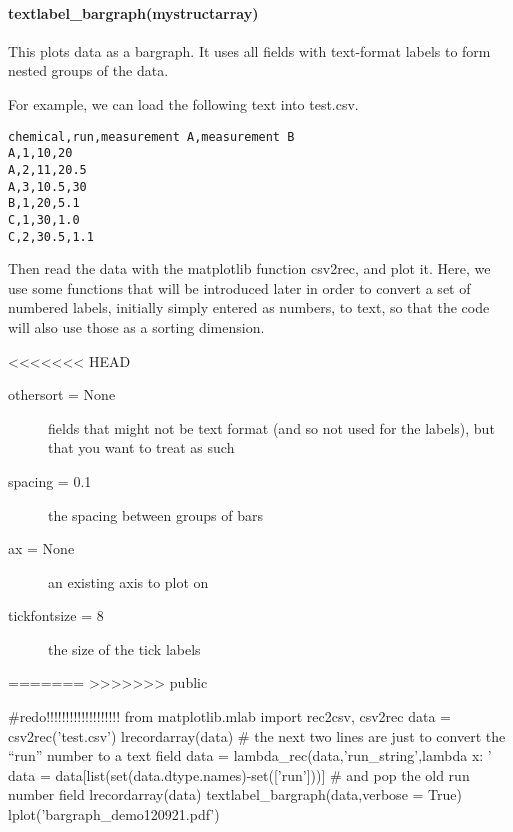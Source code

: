 \paragraph{textlabel\_bargraph(mystructarray)}
This plots data as a bargraph.
It uses all fields with text-format labels to form nested groups of the data.

For example, we can load the following text into test.csv.

\begin{verbatim}
chemical,run,measurement A,measurement B
A,1,10,20
A,2,11,20.5
A,3,10.5,30
B,1,20,5.1
C,1,30,1.0
C,2,30.5,1.1
\end{verbatim}

Then read the data with the matplotlib function csv2rec,
    and plot it.
Here, we use some functions that will be introduced later in order
    to convert a set of numbered labels, initially simply entered as numbers,
    to text, so that the code will also use those as a sorting dimension.

<<<<<<< HEAD
\begin{mykwargs}
    \begin{description}
        \item[othersort = None] fields that might not be text format (and so not used for the labels), but that you want to treat as such
        \item[spacing = 0.1]  the spacing between groups of bars
        \item[ax = None] an existing axis to plot on
        \item[tickfontsize = 8] the size of the tick labels
    \end{description}
\end{mykwargs}

=======
>>>>>>> public
\begin{python}
#redo!!!!!!!!!!!!!!!!!!!
from matplotlib.mlab import rec2csv, csv2rec
data = csv2rec('test.csv')
lrecordarray(data)
# the next two lines are just to convert the ``run'' number to a text field
data = lambda_rec(data,'run_string',lambda x: '%
data = data[list(set(data.dtype.names)-set(['run']))] # and pop the old run number field
lrecordarray(data)
textlabel_bargraph(data,verbose = True)
lplot('bargraph_demo120921.pdf')
\end{python}

